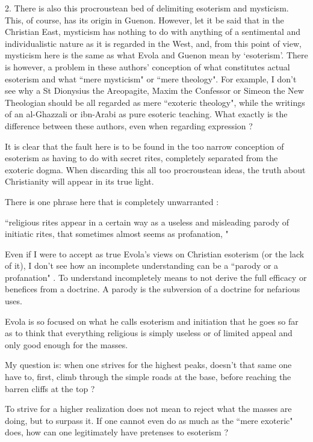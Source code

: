 \begin{footnotesize}
\begin{sffamily}
2. There is also this procroustean bed of delimiting esoterism and mysticism. This, of course, has its origin in Guenon. However, let it be said that in the Christian East, mysticism has nothing to do with anything of a sentimental and individualistic nature as it is regarded in the West, and, from this point of view, mysticism here is the same as what Evola and Guenon mean by `esoterism'. There is however, a problem in these authors' conception of what constitutes actual esoterism and what ``mere mysticism" or ``mere theology". For example, I don't see why a St Dionysius the Areopagite, Maxim the Confessor or Simeon the New Theologian should be all regarded as mere ``exoteric theology", while the writings of an al-Ghazzali or ibn-Arabi as pure esoteric teaching. What exactly is the difference between these authors, even when regarding expression ?

It is clear that the fault here is to be found in the too narrow conception of esoterism as having to do with secret rites, completely separated from the exoteric dogma. When discarding this all too procroustean ideas, the truth about Christianity will appear in its true light. 

There is one phrase here that is completely unwarranted :

``religious rites appear in a certain way as a useless and misleading parody of initiatic rites, that sometimes almost seems as profanation, "

Even if I were to accept as true Evola's views on Christian esoterism (or the lack of it), I don't see how an incomplete understanding can be a ``parody or a profanation" . To understand incompletely means to not derive the full efficacy or benefices from a doctrine. A parody is the subversion of a doctrine for nefarious uses.

Evola is so focused on what he calls esoterism and initiation that he goes so far as to think that everything religious is simply useless or of limited appeal and only good enough for the masses. 

My question is: when one strives for the highest peaks, doesn't that same one have to, first, climb through the simple roads at the base, before reaching the barren cliffs at the top ?

To strive for a higher realization does not mean to reject what the masses are doing, but to surpass it. If one cannot even do as much as the ``mere exoteric" does, how can one legitimately have pretenses to esoterism ?



\end{sffamily}
\end{footnotesize}

